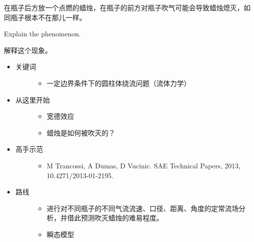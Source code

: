 \documentclass[a4paper,10pt,english]{sphinxmanual}
\begin{document}
在瓶子后方放一个点燃的蜡烛，在瓶子的前方对瓶子吹气可能会导致蜡烛熄灭，如同瓶子根本不在那儿一样。

Explain the phenomenon.

解释这个现象。
\begin{itemize}
\item {} \begin{description}
\item[{关键词}] \leavevmode\begin{itemize}
\item {} 
一定边界条件下的圆柱体绕流问题（流体力学）

\end{itemize}

\end{description}

\item {} \begin{description}
\item[{从这里开始}] \leavevmode\begin{itemize}
\item {} 
宽德效应 

\item {} 
蜡烛是如何被吹灭的？

\end{itemize}

\end{description}

\item {} \begin{description}
\item[{高手示范}] \leavevmode\begin{itemize}
\item {} 
M Trancossi, A Dumas, D Vucinic.  SAE Technical Papers, 2013, 10.4271/2013-01-2195.

\end{itemize}

\end{description}

\item {} \begin{description}
\item[{路线}] \leavevmode\begin{itemize}
\item {} 
进行对不同瓶子的不同气流流速、口径、距离、角度的定常流场分析，并借此预测吹灭蜡烛的难易程度。

\item {} 
瞬态模型

\end{itemize}

\end{description}

\end{itemize}
\end{document}
